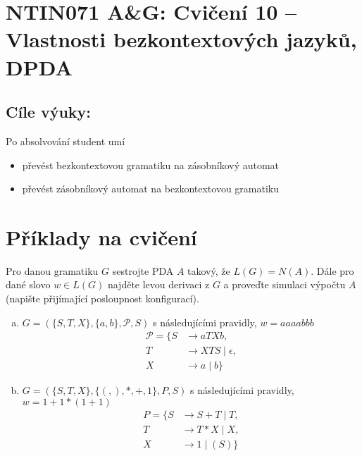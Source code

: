 \documentclass[a4paper,12pt]{amsart}
\begin{document}
\thispagestyle{empty}

\section*{NTIN071 A\&G: Cvičení 10 -- Vlastnosti bezkontextových jazyků, DPDA}

\medskip

\subsection*{Cíle výuky:} Po absolvování student umí

\begin{itemize}\setlength{\itemsep}{0pt}
    \item převést bezkontextovou gramatiku na zásobníkový automat
    \item převést zásobníkový automat na bezkontextovou gramatiku
\end{itemize}

\section*{Příklady na cvičení}

\smallskip\begin{problem}

    Pro danou gramatiku $G$ sestrojte PDA $A$ takový, že $L(G)=N(A)$. Dále pro dané slovo $w\in L(G)$ najděte levou derivaci z $G$ a proveďte simulaci výpočtu $A$ (napište přijímající posloupnost konfigurací).

    \begin{enumerate}[(a)]\setlength\itemsep{6pt}
        \item $G=(\{S,T,X\},\{a,b\},\mathcal P,S)$ s následujícími pravidly, $w=aaaabbb$
        \begin{align*}
            \mathcal P=\{S&\rightarrow aTXb, \\
            T&\rightarrow XTS\mid \epsilon,\\ 
            X&\rightarrow a\mid b\}
        \end{align*}
        \item $G=(\{S,T,X\},\{(,),*,+,1\},P,S)$ s následujícími pravidly, $w=1+1*(1+1)$
        \begin{align*}
            P=\{S&\rightarrow S+T\mid T, \\
            T&\rightarrow T*X\mid X,\\ 
            X&\rightarrow 1\mid (S)\}
        \end{align*}
    \end{enumerate}

\end{problem}
    
\end{document}
